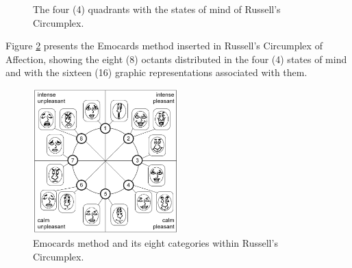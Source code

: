 \begin{figure}[!htb]
        \centering
        \caption{The four (4) quadrants with the states of mind of Russell's Circumplex.}
        \label{fig:Octantes}
        
\end{figure}

Figure \ref{fig:EmocardsMethod} presents the Emocards method inserted in Russell's Circumplex of Affection, showing the eight (8) octants distributed in the four (4) states of mind and with the sixteen (16) graphic representations associated with them.

\begin{figure}[!htb]
        \centering
        \caption{Emocards method and its eight categories within Russell's Circumplex.}
        \label{fig:EmocardsMethod}
        \includegraphics[width=0.5\textwidth]{img/Emocards.png}
\end{figure}

